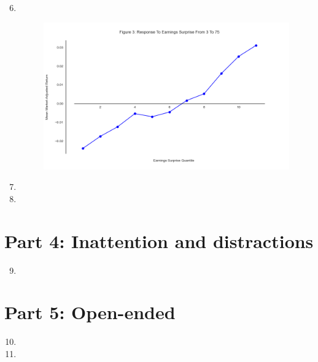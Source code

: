 \documentclass[11pt]{article}
\begin{document}
\begin{enumerate}
\setcounter{enumi}{5}
\renewcommand{\labelenumi}{(\theenumi)}
    \item \, \\
    \begin{figure}[H] 
        \centering
        \includegraphics[width=.8\textwidth]{fig3.png}
    \end{figure}
    
    \item
    
    \item

\end{enumerate}

\section{Part 4: Inattention and distractions}

\begin{enumerate}
\setcounter{enumi}{8}
\renewcommand{\labelenumi}{(\theenumi)}
    \item 

\end{enumerate}

\section{Part 5: Open-ended}

\begin{enumerate}
\setcounter{enumi}{9}
\renewcommand{\labelenumi}{(\theenumi)}
    \item 

    \item

\end{enumerate}
\end{document}
